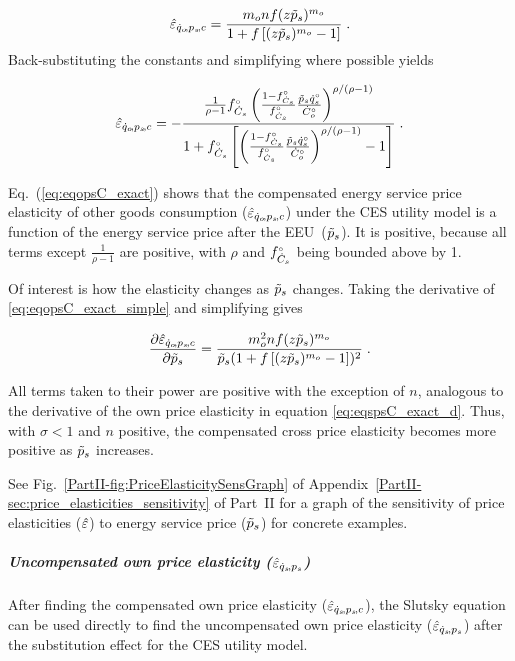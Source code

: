 \documentclass[12pt]{article}\usepackage[]{graphicx}\usepackage[]{xcolor}
\begin{document}
\begin{equation} \label{eq:eqopsC_exact_simple}
  \hat{\varepsilon}_{\dot{q}_o\!,p_s\!,c} = \frac{m_o n f (z \tilde{p}_s)^{m_o}}{1 + f \left[ (z \tilde{p}_s)^{m_o} - 1 \right]} \; .
\end{equation}
%
Back-substituting the constants and simplifying where possible yields

\begin{equation} \label{eq:eqopsC_exact}
  \hat{\varepsilon}_{\dot{q}_o\!,p_s\!,c} = - \frac{\frac{1}{\rho - 1} {}{f}^{\scriptscriptstyle \circ}_{\dot{C}_s} \left( \frac{1 - {}{f}^{\scriptscriptstyle \circ}_{\dot{C}_s}}{{}{f}^{\scriptscriptstyle \circ}_{\dot{C}_s}} \frac{\tilde{p}_s {}{\dot{q}}^{\scriptscriptstyle \circ}_s}{{}{\dot{C}}^{\scriptscriptstyle \circ}_o} \right) ^ {\rho / (\rho - 1)} }{1 + {}{f}^{\scriptscriptstyle \circ}_{\dot{C}_s} \left[ \left( \frac{1 - {}{f}^{\scriptscriptstyle \circ}_{\dot{C}_s}}{{}{f}^{\scriptscriptstyle \circ}_{\dot{C}_s}} \frac{\tilde{p}_s {}{\dot{q}}^{\scriptscriptstyle \circ}_s}{{}{\dot{C}}^{\scriptscriptstyle \circ}_o} \right)^{\rho/(\rho - 1)} - 1 \right]} \; .
\end{equation}

Eq.~(\ref{eq:eqopsC_exact}) shows that the compensated 
energy service price elasticity of other goods consumption ($\hat{\varepsilon}_{\dot{q}_o\!,p_s\!,c}$)
under the CES utility model is a function 
of the energy service price after the EEU~($\tilde{p}_s$).
It is positive, because all terms except $\frac{1}{\rho - 1}$ are positive,
with $\rho$ and ${}{f}^{\scriptscriptstyle \circ}_{\dot{C}_s}$ being bounded above by 1.

Of interest is how the elasticity changes as $\tilde{p}_s$ changes. Taking
the derivative of \ref{eq:eqopsC_exact_simple} and simplifying gives

\begin{equation}
 \pdv{\hat{\varepsilon}_{\dot{q}_o\!,p_s\!,c}}{\tilde{p}_s} = \frac{m_o^2 n f (z \tilde{p}_s)^{m_o}}{\tilde{p}_s (1 + f \left[ (z \tilde{p}_s)^{m_o} - 1 \right])^2} \; .
\end{equation}

All terms taken to their power are positive with the exception of $n$,
analogous to the derivative of the own price elasticity in equation \ref{eq:eqspsC_exact_d}. 
Thus, with $\sigma<1$ and $n$ positive, the compensated cross price
elasticity becomes more positive as $\tilde{p}_s$ increases.

See Fig.~\ref{PartII-fig:PriceElasticitySensGraph} of 
Appendix~\ref{PartII-sec:price_elasticities_sensitivity} of Part~II 
for a graph of the sensitivity of price elasticities ($\hat{\varepsilon}$)
to energy service price ($\tilde{p}_s$) for concrete examples.


\subparagraph{Uncompensated own price elasticity ($\hat{\varepsilon}_{\dot{q}_s\!,p_s}$)} 

After finding the compensated own price elasticity ($\hat{\varepsilon}_{\dot{q}_s\!,p_s\!,c}$),
the Slutsky equation can be used directly to find the 
uncompensated own price elasticity ($\hat{\varepsilon}_{\dot{q}_s\!,p_s}$)
after the substitution effect for the CES utility model.
\end{document}

